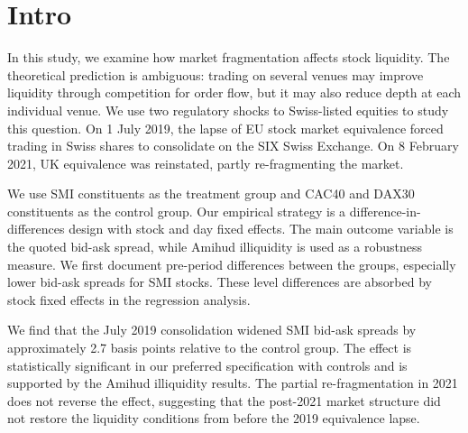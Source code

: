 \section{Intro}
\label{sec:intro}

In this study, we examine how market fragmentation affects stock liquidity. The theoretical prediction is ambiguous: trading on several venues may improve liquidity through competition for order flow, but it may also reduce depth at each individual venue. We use two regulatory shocks to Swiss-listed equities to study this question. On 1 July 2019, the lapse of EU stock market equivalence forced trading in Swiss shares to consolidate on the SIX Swiss Exchange. On 8 February 2021, UK equivalence was reinstated, partly re-fragmenting the market.

We use SMI constituents as the treatment group and CAC40 and DAX30 constituents as the control group. Our empirical strategy is a difference-in-differences design with stock and day fixed effects. The main outcome variable is the quoted bid-ask spread, while Amihud illiquidity is used as a robustness measure. We first document pre-period differences between the groups, especially lower bid-ask spreads for SMI stocks. These level differences are absorbed by stock fixed effects in the regression analysis.

We find that the July 2019 consolidation widened SMI bid-ask spreads by approximately 2.7 basis points relative to the control group. The effect is statistically significant in our preferred specification with controls and is supported by the Amihud illiquidity results. The partial re-fragmentation in 2021 does not reverse the effect, suggesting that the post-2021 market structure did not restore the liquidity conditions from before the 2019 equivalence lapse.
